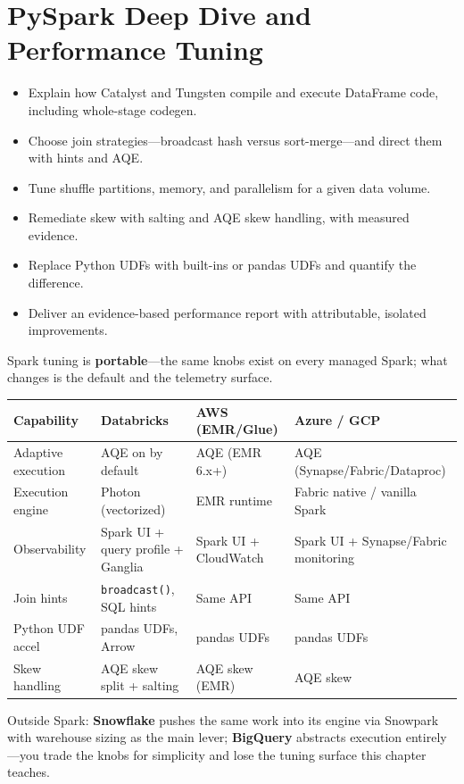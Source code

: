\chapter{PySpark Deep Dive and Performance Tuning}
%
%
\begin{objectives}
\begin{itemize}
    \item Explain how Catalyst and Tungsten compile and execute DataFrame code, including whole-stage codegen.
    \item Choose join strategies---broadcast hash versus sort-merge---and direct them with hints and AQE.
    \item Tune shuffle partitions, memory, and parallelism for a given data volume.
    \item Remediate skew with salting and AQE skew handling, with measured evidence.
    \item Replace Python UDFs with built-ins or pandas UDFs and quantify the difference.
    \item Deliver an evidence-based performance report with attributable, isolated improvements.
\end{itemize}
\end{objectives}

\begin{crosscloud}
Spark tuning is \textbf{portable}---the same knobs exist on every managed Spark; what changes is
the default and the telemetry surface.

\vspace{2mm}
{\footnotesize
\begin{tabular}{@{}p{3.0cm}p{3.4cm}p{3.2cm}p{3.2cm}@{}}
\toprule
\textbf{Capability} & \textbf{Databricks} & \textbf{AWS (EMR/Glue)} & \textbf{Azure / GCP} \\
\midrule
Adaptive execution & AQE on by default & AQE (EMR 6.x+) & AQE (Synapse/Fabric/Dataproc) \\
Execution engine & Photon (vectorized) & EMR runtime & Fabric native / vanilla Spark \\
Observability & Spark UI + query profile + Ganglia & Spark UI + CloudWatch & Spark UI + Synapse/Fabric monitoring \\
Join hints & \texttt{broadcast()}, SQL hints & Same API & Same API \\
Python UDF accel & pandas UDFs, Arrow & pandas UDFs & pandas UDFs \\
Skew handling & AQE skew split + salting & AQE skew (EMR) & AQE skew \\
\bottomrule
\end{tabular}}

\vspace{1mm}
Outside Spark: \textbf{Snowflake} pushes the same work into its engine via Snowpark with warehouse
sizing as the main lever; \textbf{BigQuery} abstracts execution entirely---you trade the knobs for
simplicity and lose the tuning surface this chapter teaches.
\end{crosscloud}

